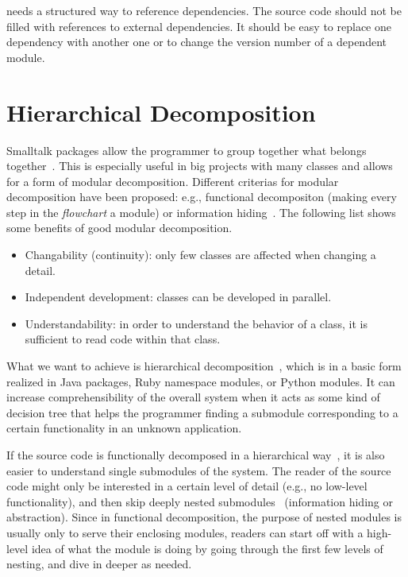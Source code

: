 \msname needs a structured way to reference dependencies. The source code should not be filled with references to external dependencies. It should be easy to replace one dependency with another one or to change the version number of a dependent module.

\section{Hierarchical Decomposition}
\label{sec:problem_hier_decomp}
Smalltalk packages allow the programmer to group together what belongs together~\cite{Eckel:2002:TJ:579108}. This is especially useful in big projects with many classes and allows for a form of modular decomposition. Different criterias for modular decomposition have been proposed: e.g., functional decompositon (making every step in the \emph{flowchart} a module) or information hiding~\cite{Parnas:1972:CUD:361598.361623}. The following list shows some benefits of good modular decomposition.

\begin{itemize}
	\item Changability (continuity): only few classes are affected when changing a detail.
	\item Independent development: classes can be developed in parallel.
	\item Understandability: in order to understand the behavior of a class, it is sufficient to read code within that class.
\end{itemize}

What we want to achieve is hierarchical decomposition~\cite{Blume:1999:HM:325478.325518}, which is in a basic form realized in Java packages, Ruby namespace modules, or Python modules. It can increase comprehensibility of the overall system when it acts as some kind of decision tree that helps the programmer finding a submodule corresponding to a certain functionality in an unknown application. 


If the source code is functionally decomposed in a hierarchical way~\cite{Tsui:2009:ESE:1823101}, it is also easier to understand single submodules of the system. The reader of the source code might only be interested in a certain level of detail (e.g., no low-level functionality), and then skip deeply nested submodules~\cite{hierarch1} (information hiding or abstraction). Since in functional decomposition, the purpose of nested modules is usually only to serve their enclosing modules, readers can start off with a high-level idea of what the module is doing by going through the first few levels of nesting, and dive in deeper as needed.


